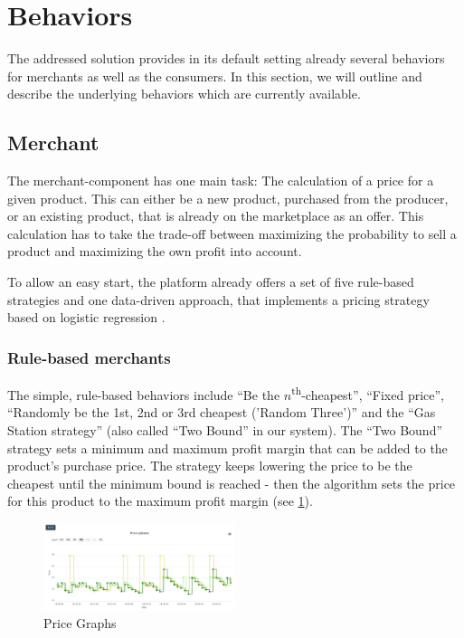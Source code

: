 \section{Behaviors}
\label{sec:Behaviors}
%
The addressed solution provides in its default setting already several behaviors for merchants as well as the consumers. In this section, we will outline and describe the underlying behaviors which are currently available.

\subsection{Merchant}
\label{sec:Behaviors_Merchants}
%
The merchant-component has one main task: The calculation of a price for a given product. This can either be a new product, purchased from the producer, or an existing product, that is already on the marketplace as an offer. This calculation has to take the trade-off between maximizing the probability to sell a product and maximizing the own profit into account. 

To allow an easy start, the platform already offers a set of five rule-based strategies and one data-driven approach, that implements a pricing strategy based on logistic regression \citep{hosmer2013applied}.

%
\subsubsection{Rule-based merchants}
%
The simple, rule-based behaviors include ``Be the $n$\textsuperscript{th}-cheapest'', ``Fixed price'', ``Randomly be the 1st, 2nd or 3rd cheapest ('Random Three')'' and the ``Gas Station strategy'' (also called ``Two Bound'' in our system). The ``Two Bound'' strategy sets a minimum and maximum profit margin that can be added to the product's purchase price. The strategy keeps lowering the price to be the cheapest until the minimum bound is reached - then the algorithm sets the price for this product to the maximum profit margin (see \cref{fig:price_graphs_v2}). \\

%
\begin{figure}[h]
    \centering
    \includegraphics[width=0.5\textwidth]{images/price_graphs_v2.png}
    \caption{Price Graphs}
    \label{fig:price_graphs_v2}
\end{figure}
%

